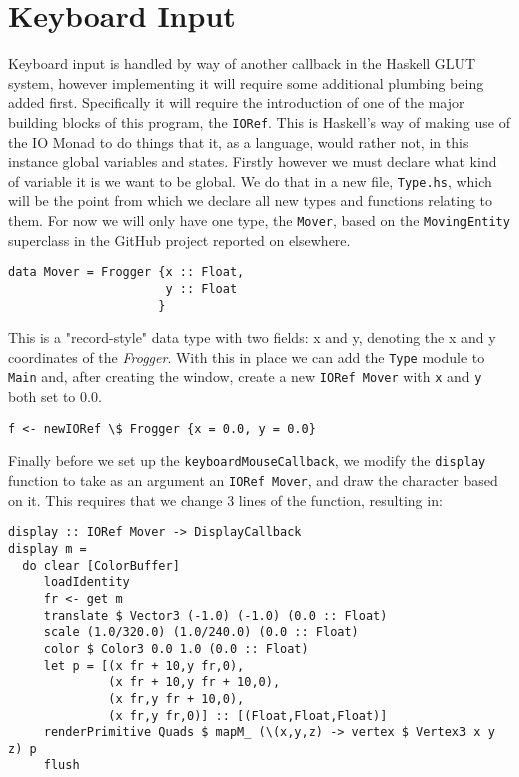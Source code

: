 \documentclass[12pt, a4paper]{report}
\begin{document}
\section{Keyboard Input}

Keyboard input is handled by way of another callback in the Haskell GLUT system, however implementing it will require some additional plumbing being added first.
Specifically it will require the introduction of one of the major building blocks of this program, the \verb|IORef|.
This is Haskell's way of making use of the IO Monad to do things that it, as a language, would rather not, in this instance global variables and states.
Firstly however we must declare what kind of variable it is we want to be global.
We do that in a new file, \verb|Type.hs|, which will be the point from which we declare all new types and functions relating to them.
For now we will only have one type, the \verb|Mover|, based on the \verb|MovingEntity| superclass in the GitHub project reported on elsewhere.

\begin{lstlisting}
data Mover = Frogger {x :: Float,
                      y :: Float
                     }
\end{lstlisting}

This is a "record-style" data type with two fields: x and y, denoting the x and y coordinates of the \textit{Frogger}.
With this in place we can add the \verb|Type| module to \verb|Main| and, after creating the window, create a new \verb|IORef Mover| with \verb|x| and \verb|y| both set to 0.0.

\begin{lstlisting}
f <- newIORef \$ Frogger {x = 0.0, y = 0.0}
\end{lstlisting}

Finally before we set up the \verb|keyboardMouseCallback|, we modify the \verb|display| function to take as an argument an \verb|IORef Mover|, and draw the character based on it.
This requires that we change 3 lines of the function, resulting in:

\begin{lstlisting}
display :: IORef Mover -> DisplayCallback
display m = 
  do clear [ColorBuffer]
     loadIdentity
     fr <- get m
     translate $ Vector3 (-1.0) (-1.0) (0.0 :: Float)
     scale (1.0/320.0) (1.0/240.0) (0.0 :: Float)
     color $ Color3 0.0 1.0 (0.0 :: Float)
     let p = [(x fr + 10,y fr,0),
              (x fr + 10,y fr + 10,0),
              (x fr,y fr + 10,0),
              (x fr,y fr,0)] :: [(Float,Float,Float)]
     renderPrimitive Quads $ mapM_ (\(x,y,z) -> vertex $ Vertex3 x y z) p
     flush
\end{lstlisting}
\end{document}
